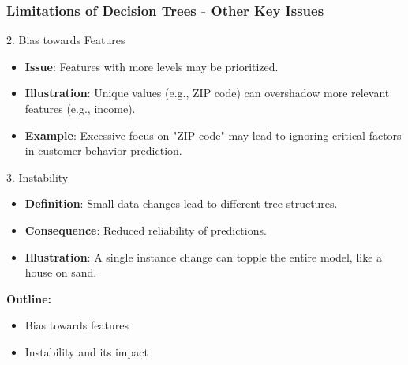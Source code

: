 \documentclass[aspectratio=169]{beamer}
\begin{document}
\begin{frame}[fragile]
    \frametitle{Limitations of Decision Trees - Other Key Issues}
    \begin{block}{2. Bias towards Features}
        \begin{itemize}
            \item \textbf{Issue}: Features with more levels may be prioritized.
            \item \textbf{Illustration}: Unique values (e.g., ZIP code) can overshadow more relevant features (e.g., income).
            \item \textbf{Example}: Excessive focus on "ZIP code" may lead to ignoring critical factors in customer behavior prediction.
        \end{itemize}
    \end{block}
  
    \begin{block}{3. Instability}
        \begin{itemize}
            \item \textbf{Definition}: Small data changes lead to different tree structures.
            \item \textbf{Consequence}: Reduced reliability of predictions.
            \item \textbf{Illustration}: A single instance change can topple the entire model, like a house on sand.
        \end{itemize}
    \end{block}
  
    \textbf{Outline:}
    \begin{itemize}
        \item Bias towards features
        \item Instability and its impact
    \end{itemize}
\end{frame}
\end{document}
